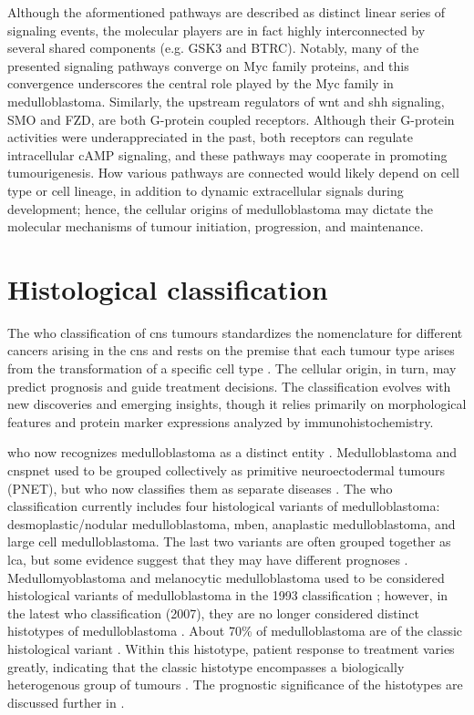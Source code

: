 Although the aformentioned pathways are described as distinct linear series of signaling events, the molecular players are in fact highly interconnected by several shared components (e.g. GSK3 and BTRC). Notably, many of the presented signaling pathways converge on Myc family proteins, and this convergence underscores the central role played by the Myc family in medulloblastoma. Similarly, the upstream regulators of \gls{wnt} and \gls{shh} signaling, SMO and FZD, are both G-protein coupled receptors. Although their G-protein activities were underappreciated in the past, both receptors can regulate intracellular cAMP signaling, and these pathways may cooperate in promoting tumourigenesis. How various pathways are connected would likely depend on cell type or cell lineage, in addition to dynamic extracellular signals during development; hence, the cellular origins of medulloblastoma may dictate the molecular mechanisms of tumour initiation, progression, and maintenance.


\section{Histological classification}

The \gls{who} classification of \gls{cns} tumours standardizes the nomenclature for different cancers arising in the \gls{cns} and rests on the premise that each tumour type arises from the transformation of a specific cell type . The cellular origin, in turn, may predict prognosis and guide treatment decisions. The classification evolves with new discoveries and emerging insights, though it relies primarily on morphological features and protein marker expressions analyzed by immunohistochemistry.

\gls{who} now recognizes medulloblastoma as a distinct entity . Medulloblastoma and \gls{cnspnet} used to be grouped collectively as primitive neuroectodermal tumours (PNET), but \gls{who} now classifies them as separate diseases . The \gls{who} classification currently includes four histological variants of medulloblastoma: desmoplastic/nodular medulloblastoma, \gls{mben}, anaplastic medulloblastoma, and large cell medulloblastoma. The last two variants are often grouped together as \gls{lca}, but some evidence suggest that they may have different prognoses . Medullomyoblastoma and melanocytic medulloblastoma used to be considered histological variants of medulloblastoma in the 1993 classification ; however, in the latest \gls{who} classification (2007), they are no longer considered distinct histotypes of medulloblastoma . About 70\% of medulloblastoma are of the classic histological variant . Within this histotype, patient response to treatment varies greatly, indicating that the classic histotype encompasses a biologically heterogenous group of tumours . The prognostic significance of the histotypes are discussed further in .

